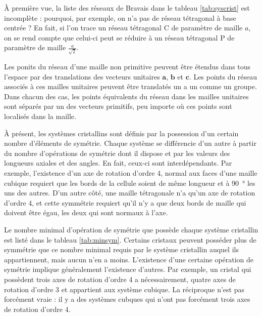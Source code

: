 À première vue, la liste des réseaux de Bravais dans le tableau
\ref{tab:syscrist} est incomplète : pourquoi, par exemple, on n'a pas de réseau
tétragonal à base centrée ? En fait, si l'on trace un réseau tétragonal C de
paramètre de maille $a$, on se rend compte que celui-ci peut se réduire à un
réseau tétragonal P de paramètre de maille $\frac{a}{\sqrt{2}}$.

Les ponits du réseau d'une maille non primitive peuvent être étendus dans tous
l'espace par des translations des vecteurs unitaires $\mathbf{a}$, $\mathbf{b}$
et $\mathbf{c}$. Les points du réseau associés à ces mailles unitaires peuvent
être translatés un a un comme un groupe. Dans chacun des cas, les points
équivalents du réseau dans les mailles unitaires sont séparés par un des vecteurs
primitifs, peu importe où ces points sont localisés dans la maille.

À présent, les systèmes cristallins sont définis par la possession d'un certain
nombre d'éléments de symétrie. Chaque système se différencie d'un autre à partir
du nombre d'opérations de symétrie dont il dispose et par les valeurs des
longueurs axiales et des angles. En fait, ceux-ci sont interdépendants. Par
exemple, l'existence d'un axe de rotation d'ordre 4, normal aux faces d'une
maille cubique requiert que les bords de la cellule soient de même longueur et à
\SI{90}{\degree} les uns des autres. D'un autre côté, une maille tétragonale n'a
qu'un axe de rotation d'ordre 4, et cette symmétrie requiert qu'il n'y a que deux
bords de maille qui doivent être égau, \ie les deux qui sont normaux à l'axe.

Le nombre minimal d'opération de symétrie que possède chaque système cristallin
est listé dans le tableau \ref{tab:minsym}. Certains cristaux peuvent posséder
plus de symmétrie que ce nombre minimal requis par le système cristallin auquel
ils appartiennent, mais aucun n'en a moins. L'existence d'une certaine opération
de symétrie implique généralement l'existence d'autres. Par exemple, un cristal
qui possèdent trois axes de rotation d'ordre 4 a nécessairement, quatre axes de
rotation d'ordre 3 et appartient aux système cubique. La réciproque n'est pas
forcément vraie : il y a des systèmes cubques qui n'ont pas forcément trois axes
de rotation d'ordre 4.

